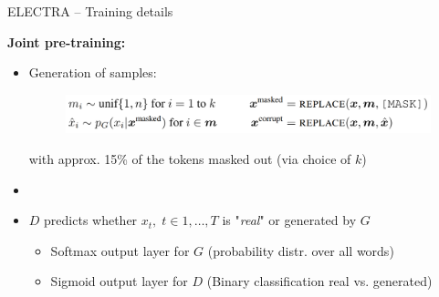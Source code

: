 
\begin{frame}{ELECTRA -- Training details}

\vfill

	\textbf{Joint pre-training:}

	\begin{itemize}
		\item Generation of samples:
	\begin{figure}
		\centering
		\includegraphics[width = 11cm]{figure/61-electra-samples.png}
	\end{figure}\vspace{-.25cm}
		{\footnotesize with approx. 15\% of the tokens masked out (via choice of $k$)}
		\item[]
		\item $D$ predicts whether $x_t,\; t \in 1, \hdots, T$ is "\textit{real}" or generated by $G$
			\begin{itemize}
				\item Softmax output layer for $G$ (probability distr. over all words)
				\item Sigmoid output layer for $D$ (Binary classification real vs. generated)
			\end{itemize}
	\end{itemize}
	
\vfill

\end{frame}


